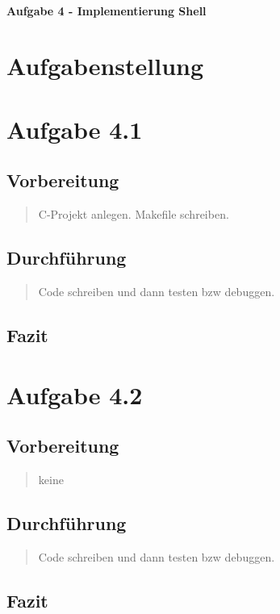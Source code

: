 \newpage

\paragraph{\LARGE Aufgabe 4 - Implementierung Shell}

\section{Aufgabenstellung}
	\begin{quote}
		
	\end{quote}
\newpage
\section{Aufgabe 4.1}
	\subsection{Vorbereitung}
		\begin{quote}
			C-Projekt anlegen.
			Makefile schreiben.
		\end{quote}
	\subsection{Durchführung}
		\begin{quote}
			Code schreiben und dann testen bzw debuggen.
		\end{quote}
	\subsection{Fazit}
		\begin{quote}
			
		\end{quote}

\section{Aufgabe 4.2}
	\subsection{Vorbereitung}
		\begin{quote}
			keine
		\end{quote}
	\subsection{Durchführung}
		\begin{quote}
			Code schreiben und dann testen bzw debuggen.
		\end{quote}
	\subsection{Fazit}
		\begin{quote}
			
		\end{quote}